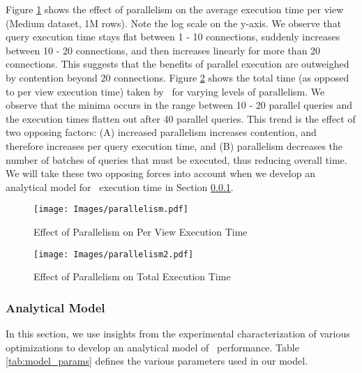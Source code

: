 Figure \ref{fig:parallelism} shows the effect of parallelism on the average
execution time per view (Medium dataset, 1M rows). Note the log scale on the
y-axis.
We observe that query execution time stays flat between 1 - 10 connections, suddenly increases between
10 - 20 connections, and then increases linearly for more than 20 connections.
This suggests that the benefits of parallel execution are outweighed by
contention beyond 20 connections. Figure \ref{fig:parallelism_total} shows the
total time (as opposed to per view execution time) taken by \SeeDB\ for varying
levels of parallelism. We observe that the minima occurs in the range between 10
- 20 parallel queries and the execution times flatten out after 40 parallel
queries.
This trend is the effect of two opposing factors: (A) increased parallelism
increases contention, and therefore increases per query execution time, and (B)
parallelism decreases the number of batches of queries that must be executed,
thus reducing overall time.
We will take these two opposing forces into account when we develop an
analytical model for \SeeDB\ execution time in Section \ref{sec:model}.

\begin{figure}[h]
  \centering 
    \texttt{[image: Images/parallelism.pdf]}
      \caption{Effect of Parallelism on Per View Execution Time} 
        \label{fig:parallelism}
\end{figure}



\begin{figure}[h]
  \centering
    \texttt{[image: Images/parallelism2.pdf]}
  \caption{Effect of Parallelism on Total Execution Time} 
    \label{fig:parallelism_total}
\end{figure}




\subsubsection{Analytical Model}
\label{sec:model}
In this section, we use insights from the experimental characterization of
various optimizations to develop an analytical model of \SeeDB\ performance.
Table \ref{tab:model_params} defines the various parameters used in our model.

